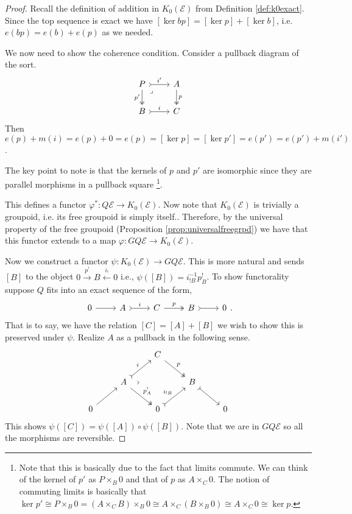 \documentclass[12pt]{report}
\numberwithin{equation}{section}
\begin{document}
\begin{proof}
			Recall the definition of addition in \( K_0(\mathcal{E}) \) from Definition \ref{def:k0exact}. Since the top sequence is exact we have \( [\ker bp]=[\ker p]+[\ker b] \), i.e. \( e(bp)=e(b)+e(p) \) as we needed.
			
			We now need to show the coherence condition. Consider a pullback diagram of the sort.
			\[\begin{tikzcd}
				P & A \\
				B & C
				\arrow["{i'}", tail, from=1-1, to=1-2]
				\arrow["{p'}"', two heads, from=1-1, to=2-1]
				\arrow["\lrcorner"{anchor=center, pos=0.125}, draw=none, from=1-1, to=2-2]
				\arrow["p", two heads, from=1-2, to=2-2]
				\arrow["i", tail, from=2-1, to=2-2]
			\end{tikzcd}\]
			Then \( e(p)+m(i)=e(p)+0=e(p)=[\ker p]=[\ker p']=e(p')=e(p')+m(i') \).
			
			The key point to note is that the kernels of \( p \) and \( p' \) are isomorphic since they are parallel morphisms in a pullback square \footnote{Note that this is basically due to the fact that limits commute. We can think of the kernel of \( p' \) as \( P\times_B 0 \) and that of \( p \) as \( A \times_C 0 \). The notion of commuting limits is basically that \( \ker p' \cong P\times_B 0 =(A \times_C B) \times_B 0 \cong A \times_C (B \times_B 0) \cong A \times_C 0 \cong \ker p\).}.
			
			This defines a functor \( \varphi^*: Q \mathcal{E} \to K_0(\mathcal{E}) \). Now note that \( K_0(\mathcal{E}) \) is trivially a groupoid, i.e. its free groupoid is simply itself.. Therefore, by the universal property of the free groupoid (Proposition \ref{prop:universalfreegrpd}) we have that this functor extends to a map \( \varphi: G Q \mathcal{E} \to K_0(\mathcal{E}) \).	
			
			Now we construct a functor \( \psi: K_0(\mathcal{E}) \to G Q \mathcal{E}\). This is more natural and sends \( [B] \) to the object \( 0 \xrightarrow{p^!}B \xleftarrow{i_!}0\) i.e., \( \psi([B])=i^{-1}_{!B}p^!_B \). To show functorality suppose \( Q \) fits into an exact sequence of the form,
			\[\begin{tikzcd}
				0 & A & C & B & 0
				\arrow[from=1-1, to=1-2]
				\arrow["i", tail, from=1-2, to=1-3]
				\arrow["p", two heads, from=1-3, to=1-4]
				\arrow[tail, from=1-4, to=1-5]
			\end{tikzcd}.\]
			That is to say, we have the relation \( [C]=[A]+[B] \) we wish to show this is preserved under \( \psi \).
			Realize \( A \) as a pullback in the following sense.
			\[\begin{tikzcd}
				&& C \\
				& A && B \\
				0 && 0 && 0
				\arrow["p", two heads, from=1-3, to=2-4]
				\arrow["i", tail, from=2-2, to=1-3]
				\arrow["\lrcorner"{anchor=center, pos=0.125, rotate=45}, draw=none, from=2-2, to=2-4]
				\arrow["{p^!_A}", two heads, from=2-2, to=3-3]
				\arrow[tail, from=2-4, to=3-5]
				\arrow[from=3-1, to=2-2]
				\arrow["{i_{!B}}", tail, from=3-3, to=2-4]
			\end{tikzcd}\]
			This shows \( \psi([C])=\psi([A])\circ\psi([B]) \). Note that we are in \( GQ \mathcal{E} \) so all the morphisms are reversible.
				

\end{proof}
\end{document}
